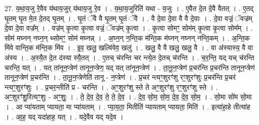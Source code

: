 \documentclass[17pt]{extarticle}
\begin{document}
27. य॒था॒य॒जु रे॒वैव य॑थाय॒जुर् य॑थाय॒जु रे॒व । . य॒था॒य॒जुरिति॑ यथा - य॒जुः । . ए॒वैत दे॒त दे॒वै वैतत् । . ए॒तद् घृ॒तम् घृ॒त मे॒त दे॒तद् घृ॒तम् । . घृ॒तं ॅवै वै घृ॒तम् घृ॒तं ॅवै । . वै दे॒वा दे॒वा वै वै दे॒वाः । . दे॒वा वज्रं॒ ॅवज्र॑म् दे॒वा दे॒वा वज्र᳚म् । . वज्र॑म् कृ॒त्वा कृ॒त्वा वज्रं॒ ॅवज्र॑म् कृ॒त्वा । . कृ॒त्वा सोमꣳ॒॒ सोम॑म् कृ॒त्वा कृ॒त्वा सोम᳚म् । . सोम॑ मघ्नन् नघ्न॒न् थ्सोमꣳ॒॒ सोम॑ मघ्नन्न् । . अ॒घ्न॒न् न॒न्ति॒क म॑न्ति॒क म॑घ्नन् नघ्नन् नन्ति॒कम् । . अ॒न्ति॒क मि॑वे वान्ति॒क म॑न्ति॒क मि॑व । . इ॒व॒ खलु॒ खल्वि॑वेव॒ खलु॑ । . खलु॒ वै वै खलु॒ खलु॒ वै । . वा अ॑स्यास्य॒ वै वा अ॑स्य । . अ॒स्यै॒त दे॒त द॑स्या स्यै॒तत् । . ए॒तच् च॑रन्ति चर न्त्ये॒त दे॒तच् च॑रन्ति । . च॒र॒न्ति॒ यद् यच् च॑रन्ति चरन्ति॒ यत् । . यत् ता॑नून॒प्त्रेण॑ तानून॒प्त्रेण॒ यद् यत् ता॑नून॒प्त्रेण॑ । . ता॒नू॒न॒प्त्रेण॑ प्र॒चर॑न्ति प्र॒चर॑न्ति तानून॒प्त्रेण॑ तानून॒प्त्रेण॑ प्र॒चर॑न्ति । . ता॒नू॒न॒प्त्रेणेति॑ तानू - न॒प्त्रेण॑ । . प्र॒चर॑ न्त्यꣳ॒॒शुरꣳ॑शु रꣳ॒॒शुरꣳ॑शुः प्र॒चर॑न्ति प्र॒चर॑ न्त्यꣳ॒॒शुरꣳ॑शुः । . प्र॒चर॒न्तीति॑ प्र - चर॑न्ति । . अꣳ॒॒शुरꣳ॑शु स्ते ते अꣳ॒॒शुरꣳ॑शु रꣳ॒॒शुरꣳ॑शु स्ते । . अꣳ॒॒शुरꣳ॑शु॒रित्यꣳ॒॒शुः - अꣳ॒॒शुः॒ । . ते॒ दे॒व॒ दे॒व॒ ते॒ ते॒ दे॒व॒ । . दे॒व॒ सो॒म॒ सो॒म॒ दे॒व॒ दे॒व॒ सो॒म॒ । . सो॒मा सो॑म सो॒मा । . आ प्या॑यताम् प्यायता॒ मा प्या॑यताम् । . प्या॒य॒ता॒ मितीति॑ प्यायताम् प्यायता॒ मिति॑ । . इत्या॑हा॒हे तीत्या॑ह । . आ॒ह॒ यद् यदा॑हाह॒ यत् । . यदे॒वैव यद् यदे॒व । \newline
\end{document}

